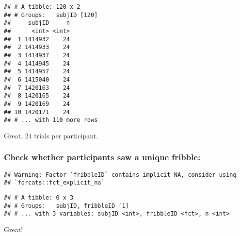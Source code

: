 \documentclass[
]{article}
\newenvironment{Shaded}{\begin{snugshade}}{\end{snugshade}}
\newcommand{\DecValTok}[1]{\textcolor[rgb]{0.00,0.00,0.81}{#1}}
\newcommand{\KeywordTok}[1]{\textcolor[rgb]{0.13,0.29,0.53}{\textbf{#1}}}
\newcommand{\NormalTok}[1]{#1}
\newcommand{\OperatorTok}[1]{\textcolor[rgb]{0.81,0.36,0.00}{\textbf{#1}}}
\newcommand{\StringTok}[1]{\textcolor[rgb]{0.31,0.60,0.02}{#1}}
\begin{document}
\begin{Shaded}
\end{Shaded}

\begin{verbatim}
## # A tibble: 120 x 2
## # Groups:   subjID [120]
##     subjID     n
##      <int> <int>
##  1 1414932    24
##  2 1414933    24
##  3 1414937    24
##  4 1414945    24
##  5 1414957    24
##  6 1415040    24
##  7 1420163    24
##  8 1420165    24
##  9 1420169    24
## 10 1420171    24
## # ... with 110 more rows
\end{verbatim}

Great, 24 trials per participant.

\hypertarget{check-whether-participants-saw-a-unique-fribble}{%
\subsubsection{Check whether participants saw a unique
fribble:}\label{check-whether-participants-saw-a-unique-fribble}}

\begin{Shaded}
\end{Shaded}

\begin{verbatim}
## Warning: Factor `fribbleID` contains implicit NA, consider using
## `forcats::fct_explicit_na`
\end{verbatim}

\begin{verbatim}
## # A tibble: 0 x 3
## # Groups:   subjID, fribbleID [1]
## # ... with 3 variables: subjID <int>, fribbleID <fct>, n <int>
\end{verbatim}

Great!
\end{document}

